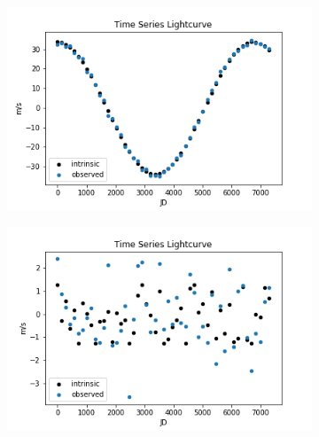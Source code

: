 \documentclass[12pt,manuscript]{aastex}
\begin{document}
\begin{figure}
  \centering
  
  \begin{subfigure}[b]{.45\linewidth}
  \includegraphics[width=\linewidth]{../figures/long_P_no_fold}
  \end{subfigure}
  \begin{subfigure}[b]{.45\linewidth}
  \includegraphics[width=\linewidth]{../figures/short_P_no_fold}
  \end{subfigure}
  

\end{figure}
\end{document}
